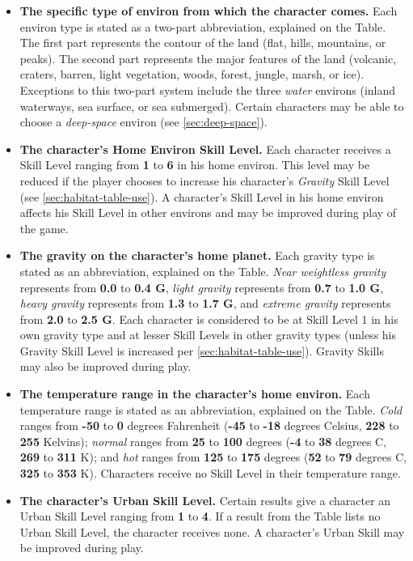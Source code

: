 \begin{itemize}
\item \textbf{The specific type of environ from which the character
    comes.}  Each environ type is stated as a two-part abbreviation,
  explained on the Table. The first part represents the contour of the
  land (flat, hills, mountains, or peaks). The second part represents
  the major features of the land (volcanic, craters, barren, light
  vegetation, woods, forest, jungle, marsh, or ice). Exceptions to
  this two-part system include the three \emph{water} environs (inland
  waterways, sea surface, or sea submerged). Certain characters may be
  able to choose a \emph{deep-space} environ (see
  \ref{sec:deep-space}).
\item \textbf{The character's Home Environ Skill Level.} Each
  character receives a Skill Level ranging from \textbf{1} to
  \textbf{6} in his home environ. This level may be reduced if the
  player chooses to increase his character's \emph{Gravity} Skill
  Level (see \ref{sec:habitat-table-use}). A character's Skill Level
  in his home environ affects his Skill Level in other environs and
  may be improved during play of the game.
\item \textbf{The gravity on the character's home planet.} Each
  gravity type is stated as an abbreviation, explained on the Table.
  \emph{Near weightless gravity} represents from \textbf{0.0} to
  \textbf{0.4 G}, \emph{light gravity} represents from \textbf{0.7} to
  \textbf{1.0 G}, \emph{heavy gravity} represents from \textbf{1.3} to
  \textbf{1.7 G}, and \emph{extreme gravity} represents from
  \textbf{2.0} to \textbf{2.5 G}. Each character is considered to be at
  Skill Level 1 in his own gravity type and at lesser Skill Levels in
  other gravity types (unless his Gravity Skill Level is increased per
  \ref{sec:habitat-table-use}). Gravity Skills may also be improved
  during play.
\item \textbf{The temperature range in the character's home
    environ.}\label{sec:player-uses-habitat-change-temp}
  Each temperature range is stated as an abbreviation, explained on
  the Table. \emph{Cold} ranges from \textbf{-50} to \textbf{0}
  degrees Fahrenheit (\textbf{-45} to \textbf{-18} degrees Celsius,
  \textbf{228} to \textbf{255} Kelvins); \emph{normal} ranges from
  \textbf{25} to \textbf{100} degrees (\textbf{-4} to \textbf{38}
  degrees C, \textbf{269} to \textbf{311} K); and \emph{hot} ranges
  from \textbf{125} to \textbf{175} degrees (\textbf{52} to
  \textbf{79} degrees C, \textbf{325} to \textbf{353} K).  Characters
  receive no Skill Level in their temperature range.
\item \textbf{The character's Urban Skill Level.} Certain results give
  a character an Urban Skill Level ranging from \textbf{1} to
  \textbf{4}. If a result from the Table lists no Urban Skill Level,
  the character receives none. A character's Urban Skill may be
  improved during play.
\end{itemize}


